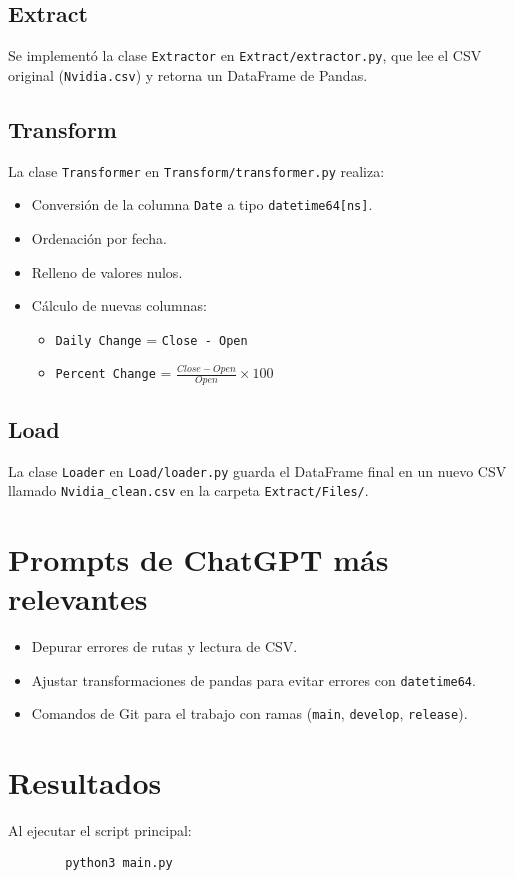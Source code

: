\documentclass[12pt,a4paper]{article}
\begin{document}
	\subsection{Extract}
	Se implementó la clase \texttt{Extractor} en \texttt{Extract/extractor.py}, que lee el CSV original (\texttt{Nvidia.csv}) y retorna un DataFrame de Pandas.
	
	\subsection{Transform}
	La clase \texttt{Transformer} en \texttt{Transform/transformer.py} realiza:
	\begin{itemize}
		\item Conversión de la columna \texttt{Date} a tipo \texttt{datetime64[ns]}.
		\item Ordenación por fecha.
		\item Relleno de valores nulos.
		\item Cálculo de nuevas columnas:
		\begin{itemize}
			\item \texttt{Daily Change} = \texttt{Close - Open}
			\item \texttt{Percent Change} = \(\frac{Close - Open}{Open} \times 100\)
		\end{itemize}
	\end{itemize}
	
	\subsection{Load}
	La clase \texttt{Loader} en \texttt{Load/loader.py} guarda el DataFrame final en un nuevo CSV llamado \texttt{Nvidia\_clean.csv} en la carpeta \texttt{Extract/Files/}.
	
	\section{Prompts de ChatGPT más relevantes}
	\begin{itemize}
		\item Depurar errores de rutas y lectura de CSV.
		\item Ajustar transformaciones de pandas para evitar errores con \texttt{datetime64}.
		\item Comandos de Git para el trabajo con ramas (\texttt{main}, \texttt{develop}, \texttt{release}).
	\end{itemize}
	
	\section{Resultados}
	Al ejecutar el script principal:
	\begin{verbatim}
		python3 main.py
	\end{verbatim}
	
\end{document}
